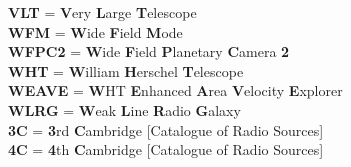 {\textbf{VLT} = \textbf{V}ery \textbf{L}arge \textbf{T}elescope \\
\textbf{WFM} = \textbf{W}ide \textbf{F}ield \textbf{M}ode \\
\textbf{WFPC2} = \textbf{W}ide \textbf{F}ield \textbf{P}lanetary \textbf{C}amera \textbf{2} \\
\textbf{WHT} = \textbf{W}illiam \textbf{H}erschel \textbf{T}elescope \\
\textbf{WEAVE} = \textbf{W}HT \textbf{E}nhanced \textbf{A}rea \textbf{V}elocity \textbf{E}xplorer \\
\textbf{WLRG} = \textbf{W}eak \textbf{L}ine \textbf{R}adio \textbf{G}alaxy \\
\textbf{3C} = \textbf{3}rd \textbf{C}ambridge [Catalogue of Radio Sources] \\
\textbf{4C} = \textbf{4}th \textbf{C}ambridge [Catalogue of Radio Sources] \\

}